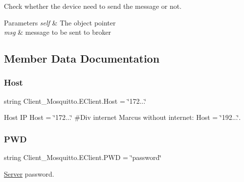 Check whether the device need to send the message or not. 


\begin{DoxyParams}{Parameters}
{\em self} & The object pointer \\
\hline
{\em msg} & message to be sent to broker \\
\hline
\end{DoxyParams}


\subsection{Member Data Documentation}
\mbox{\label{class_client___mosquitto_1_1_e_client_a8a284ffe41a54be27472fe09172e9373}} 
\subsubsection{\texorpdfstring{Host}{Host}}
{\footnotesize\ttfamily string Client\+\_\+\+Mosquitto.\+E\+Client.\+Host = \char`\"{}172...\char`\"{}\hspace{0.3cm}{\ttfamily [static]}}



Host IP Host = \char`\"{}172...\char`\"{} \#\+Div internet Marcus without internet\+: Host = \char`\"{}192...\char`\"{}. 

\mbox{\label{class_client___mosquitto_1_1_e_client_ad3cf4147566af0f38560371973639471}} 
\subsubsection{\texorpdfstring{P\+WD}{PWD}}
{\footnotesize\ttfamily string Client\+\_\+\+Mosquitto.\+E\+Client.\+P\+WD = \char`\"{}password\char`\"{}\hspace{0.3cm}{\ttfamily [static]}}



\mbox{\hyperlink{namespace_server}{Server}} password. 

